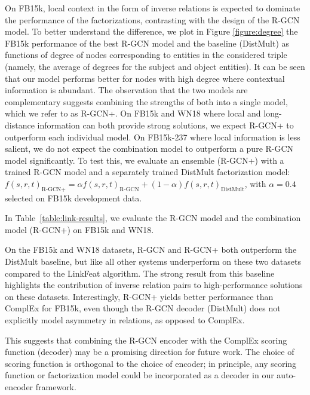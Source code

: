 On FB15k, local context in the form of inverse relations is expected to dominate the performance of the factorizations, contrasting with the design of the R-GCN model. To better understand the difference, we plot in Figure \ref{figure:degree} the FB15k performance of the best R-GCN model and the baseline (DistMult) as functions of degree of nodes corresponding to entities in the considered triple
(namely, the average of degrees for the subject and object entities). It can be seen that our model performs better for nodes with high degree where contextual information is abundant. The observation that the two models are complementary suggests combining the strengths of both into a single model, which we refer to as R-GCN+. On FB15k and WN18 where local and long-distance information can both provide strong solutions, we expect R-GCN+ to outperform each individual model. On FB15k-237 where local information is less salient, we do not expect the combination model to outperform a pure R-GCN model significantly. To test this, we evaluate an ensemble (R-GCN+) with a trained R-GCN model and a separately trained DistMult factorization model: $f(s,r,t)_{\text{R-GCN+}} = \alpha f(s,r,t)_{\text{R-GCN}} + (1- \alpha) f(s,r,t)_{\text{DistMult}}$, with $\alpha=0.4$ selected on FB15k development data.

In Table~\ref{table:link-results}, we evaluate the R-GCN model and the combination model (R-GCN+) on FB15k and WN18.

On the FB15k and WN18 datasets, R-GCN and R-GCN+ both outperform the DistMult baseline, but like all other systems underperform on these two datasets compared to the LinkFeat algorithm. The strong result from this baseline highlights the contribution of inverse relation pairs to high-performance solutions on these datasets. Interestingly, R-GCN+ yields better performance than ComplEx for FB15k, even though the R-GCN decoder (DistMult) does not explicitly model asymmetry in relations, as opposed to ComplEx.

This suggests that combining the R-GCN encoder with the ComplEx scoring function (decoder) may be a promising direction for future work. The choice of scoring function is orthogonal to the choice of encoder; in principle, any scoring function or factorization model could be incorporated as a decoder in our auto-encoder framework.

